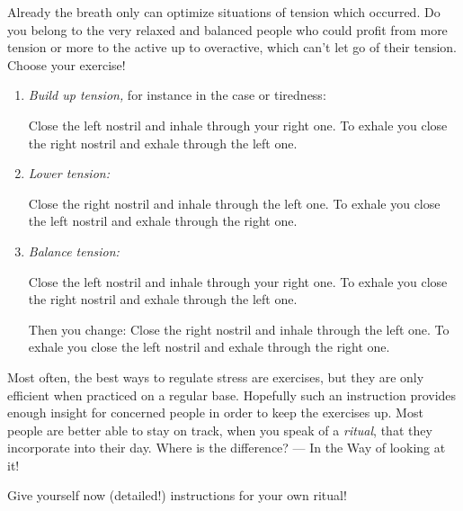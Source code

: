 \documentclass[../main.tex]{subfiles}
\begin{document}
\label{Ex:BreathingEx}
Already the breath only can optimize situations of tension which occurred.
Do you belong to the very relaxed and balanced people who could profit from more tension
or more to the active up to overactive, which can't let go of their tension.
Choose your exercise!

\begin{enumerate}
\item \emph{Build up tension,} for instance in the case or tiredness:

  Close the left nostril and inhale through your right one.
  To exhale you close the right nostril and exhale through the left one.

\item \emph{Lower tension:}

  Close the right nostril and inhale through the left one.
  To exhale you close the left nostril and exhale through the right one.

\item \emph{Balance tension:}

  Close the left nostril and inhale through your right one.
  To exhale you close the right nostril and exhale through the left one.

  Then you change:
   Close the right nostril and inhale through the left one.
  To exhale you close the left nostril and exhale through the right one.

\end{enumerate}

Most often, the best ways to regulate stress are exercises, but they are only efficient when practiced on a regular base.
Hopefully such an instruction provides enough insight for concerned people in order to keep the exercises up.
Most people are better able to stay on track, when you speak of a \emph{ritual}, that they incorporate into their day.
Where is the difference? --- In the Way of looking at it!

Give yourself now (detailed!) instructions for your own ritual!
\end{document}
